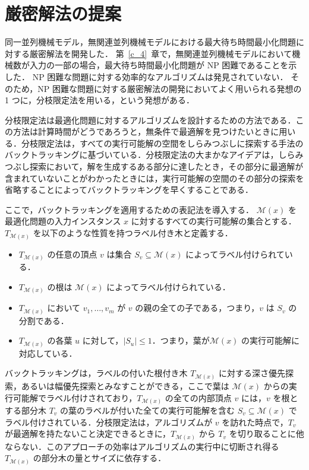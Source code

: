 \documentclass[12pt]{optlab-bachelor}
\begin{document}
\section{厳密解法の提案}\label{5_s_1}
同一並列機械モデル，無関連並列機械モデルにおける最大待ち時間最小化問題に対する厳密解法を開発した．
第~\ref{c_4}~章で，無関連並列機械モデルにおいて機械数が入力の一部の場合，最大待ち時間最小化問題が NP 困難であることを示した．
NP 困難な問題に対する効率的なアルゴリズムは発見されていない．
そのため，NP 困難な問題に対する厳密解法の開発においてよく用いられる発想の 1 つに，分枝限定法を用いる，という発想がある．

分枝限定法は最適化問題に対するアルゴリズムを設計するための方法である．この方法は計算時間がどうであろうと，無条件で最適解を見つけたいときに用いる．分枝限定法は，すべての実行可能解の空間をしらみつぶしに探索する手法のバックトラッキングに基づいている．分枝限定法の大まかなアイデアは，しらみつぶし探索において，解を生成するある部分に達したとき，その部分に最適解が含まれていないことがわかったときには，実行可能解の空間のその部分の探索を省略することによってバックトラッキングを早くすることである．

ここで，バックトラッキングを適用するための表記法を導入する．
$\mathcal{M}(x)$ を最適化問題の入力インスタンス $x$ に対するすべての実行可能解の集合とする．$T_{\mathcal{M}(x)}$ を以下のような性質を持つラベル付き木と定義する．
\begin{itemize}
  \item $T_{\mathcal{M}(x)}$ の任意の頂点 $v$ は集合 $S_v \subseteq \mathcal{M}(x)$ によってラベル付けられている．
  \item $T_{\mathcal{M}(x)}$ の根は $\mathcal{M}(x)$ によってラベル付けられている．
  \item $T_{\mathcal{M}(x)}$ において $v_1,\ldots,v_m$ が $v$ の親の全ての子である，つまり，$v$ は $S_v$ の分割である．
  \item $T_{\mathcal{M}(x)}$ の各葉 $u$ に対して，$|S_u| \le 1$．つまり，葉が$\mathcal{M}(x)$ の実行可能解に対応している．
\end{itemize}

バックトラッキングは，ラベルの付いた根付き木 $T_{\mathcal{M}(x)}$ に対する深さ優先探索，あるいは幅優先探索とみなすことができる，ここで葉は $\mathcal{M}(x)$ からの実行可能解でラベル付けされており，$T_{\mathcal{M}(x)}$ の全ての内部頂点 $v$ には，$v$ を根とする部分木 $T_v$ の葉のラベルが付いた全ての実行可能解を含む $S_v \subseteq \mathcal{M}(x)$ でラベル付けされている．分枝限定法は，アルゴリズムが $v$ を訪れた時点で，$T_v$ が最適解を持たないこと決定できるときに，$T_{\mathcal{M}(x)}$ から $T_v$ を切り取ることに他ならない．このアプローチの効率はアルゴリズムの実行中に切断され得る $T_{\mathcal{M}(x)}$ の部分木の量とサイズに依存する．
\end{document}
